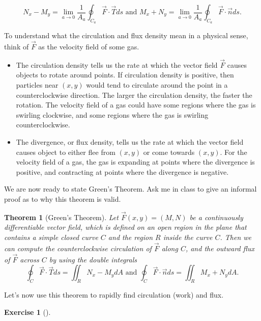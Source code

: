 \documentclass[10pt,]{book}
\theoremstyle{plain}
\newtheorem{theorem}{Theorem}[section]
\theoremstyle{definition}
\theoremstyle{definition}
\theoremstyle{definition}
\theoremstyle{definition}
\newtheorem{exploration}[project]{Exercise}
\theoremstyle{definition}
\numberwithin{equation}{section}
\begin{document}
\begin{equation*}
N_x-M_y=\lim_{a\to 0} \frac{1}{A_a}\oint_{C_a} \vec F \cdot \vec T ds  \text{ and }   M_x+N_y=\lim_{a\to 0} \frac{1}{A_a}\oint_{C_a} \vec F \cdot \vec n ds.
\end{equation*}
%
\par
To understand what the circulation and flux density mean in a physical sense, think of \(\vec F\) as the velocity field of some gas. \leavevmode%
\begin{itemize}[label=\textbullet]
\item{}The circulation density tells us the rate at which the vector field \(\vec F\) causes objects to rotate around points.  If circulation density is positive, then particles near \((x,y)\) would tend to circulate around the point in a counterclockwise direction. The larger the circulation density, the faster the rotation. The velocity field of a gas could have some regions where the gas is swirling clockwise, and some regions where the gas is swirling counterclockwise.%
\item{}The divergence, or flux density, tells us the rate at which the vector field causes object to either flee from \((x,y)\) or come towards \((x,y)\). For the velocity field of a gas, the gas is expanding at points where the divergence is positive, and contracting at points where the divergence is negative.%
\end{itemize}
%
\par
We are now ready to state Green's Theorem. Ask me in class to give an informal proof as to why this theorem is valid.%
\begin{theorem}[{Green's Theorem}]\label{theorem-12}
Let \(\vec F(x,y)=(M,N)\) be a continuously differentiable vector field, which is defined on an open region in the plane that contains a simple closed curve \(C\) and the region \(R\) inside the curve \(C\). Then we can compute the counterclockwise circulation of \(\vec F\) along \(C\), and the outward flux of \(\vec F\) across \(C\) by using the double integrals%
\begin{equation*}
\oint_{C} \vec F \cdot \vec T ds=\iint_R N_x-M_y dA 
\text{ and }   
\oint_{C} \vec F \cdot \vec n ds=\iint_R M_x+N_y dA.
\end{equation*}
%
\end{theorem}
Let's now use this theorem to rapidly find circulation (work) and flux.%
\begin{exploration}[]\label{exploration-272}
\end{exploration}
\end{document}
